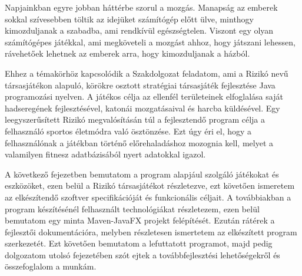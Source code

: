 Napjainkban egyre jobban háttérbe szorul a mozgás. Manapság az emberek sokkal szívesebben töltik az idejüket számítógép előtt ülve, minthogy kimozduljanak a szabadba, ami rendkívül egészségtelen. Viszont egy olyan számítógépes játékkal, ami megköveteli a mozgást ahhoz, hogy játszani lehessen, rávehetőek lehetnek az emberek arra, hogy kimozduljanak a házból. 

Ehhez a témakörhöz kapcsolódik a Szakdolgozat feladatom, ami a Rizikó nevű társasjátékon alapuló, körökre osztott stratégiai társasjáték fejlesztése Java programozási nyelven. A játékos célja az ellenfél területeinek elfoglalása saját hadseregének fejlesztésével, katonái mozgatásaival és harcba küldésével. Egy leegyszerűsített Rizikó megvalósításán túl a fejlesztendő program célja a felhasználó sportos életmódra való ösztönzése. Ezt úgy éri el, hogy a felhasználónak a játékban történő előrehaladáshoz mozognia kell, melyet a valamilyen fitnesz adatbázisából nyert adatokkal igazol. 

A következő fejezetben bemutatom a program alapjául szolgáló játékokat és eszközöket, ezen belül a Rizikó társasjátékot részletezve, ezt követően ismeretem az elkészítendő szoftver specifikációját és funkcionális céljait. A továbbiakban a program készítésénél felhasznált technológiákat részletezem, ezen belül bemutatom egy minta Maven-JavaFX projekt felépítését. Ezután rátérek a fejlesztői dokumentációra, melyben részletesen ismertetem az elkészített program szerkezetét. Ezt követően bemutatom a lefuttatott programot, majd pedig dolgozatom utolsó fejezetében szót ejtek a továbbfejlesztési lehetőségekről és összefoglalom a munkám. 